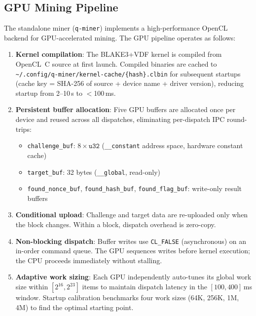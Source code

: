 \documentclass[11pt,a4paper]{article}
\begin{document}
\subsection{GPU Mining Pipeline}

The standalone miner (\texttt{q-miner}) implements a high-performance OpenCL backend for GPU-accelerated mining. The GPU pipeline operates as follows:

\begin{enumerate}
    \item \textbf{Kernel compilation}: The BLAKE3+VDF kernel is compiled from OpenCL~C source at first launch. Compiled binaries are cached to \texttt{\textasciitilde/.config/q-miner/kernel-cache/\{hash\}.clbin} for subsequent startups (cache key = SHA-256 of source + device name + driver version), reducing startup from 2--10\,s to $<$100\,ms.

    \item \textbf{Persistent buffer allocation}: Five GPU buffers are allocated once per device and reused across all dispatches, eliminating per-dispatch IPC round-trips:
    \begin{itemize}
        \item \texttt{challenge\_buf}: $8 \times \mathtt{u32}$ (\texttt{\_\_constant} address space, hardware constant cache)
        \item \texttt{target\_buf}: 32 bytes (\texttt{\_\_global}, read-only)
        \item \texttt{found\_nonce\_buf}, \texttt{found\_hash\_buf}, \texttt{found\_flag\_buf}: write-only result buffers
    \end{itemize}

    \item \textbf{Conditional upload}: Challenge and target data are re-uploaded only when the block changes. Within a block, dispatch overhead is zero-copy.

    \item \textbf{Non-blocking dispatch}: Buffer writes use \texttt{CL\_FALSE} (asynchronous) on an in-order command queue. The GPU sequences writes before kernel execution; the CPU proceeds immediately without stalling.

    \item \textbf{Adaptive work sizing}: Each GPU independently auto-tunes its global work size within $[2^{16}, 2^{23}]$ items to maintain dispatch latency in the $[100, 400]$\,ms window. Startup calibration benchmarks four work sizes (64K, 256K, 1M, 4M) to find the optimal starting point.
\end{enumerate}
\end{document}
